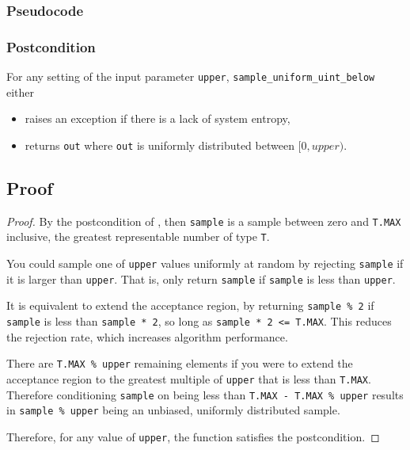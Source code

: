 \documentclass{article}
\begin{document}
\subsubsection*{Pseudocode}



\subsubsection*{Postcondition}
For any setting of the input parameter \texttt{upper},
\texttt{sample\_uniform\_uint\_below} either
\begin{itemize}
    \item raises an exception if there is a lack of system entropy,
    \item returns \texttt{out} where \texttt{out} is uniformly distributed between $[0, upper)$.
\end{itemize}

\subsection{Proof}
\begin{proof} 
\label{unsigned-integer-proof}
By the postcondition of ,
then \texttt{sample} is a sample between zero and \texttt{T.MAX} inclusive, the greatest representable number of type \texttt{T}.

You could sample one of \texttt{upper} values uniformly at random by rejecting \texttt{sample} if it is larger than \texttt{upper}.
That is, only return \texttt{sample} if \texttt{sample} is less than \texttt{upper}.

It is equivalent to extend the acceptance region, 
by returning \texttt{sample \% 2} if \texttt{sample} is less than \texttt{sample * 2}, 
so long as \texttt{sample * 2 <= T.MAX}.
This reduces the rejection rate, which increases algorithm performance.

There are \texttt{T.MAX \% upper} remaining elements if you were to 
extend the acceptance region to the greatest multiple of \texttt{upper} that is less than \texttt{T.MAX}.
Therefore conditioning \texttt{sample} on being less than \texttt{T.MAX - T.MAX \% upper} 
results in \texttt{sample \% upper} being an unbiased, uniformly distributed sample.

\noindent Therefore, for any value of \texttt{upper}, the function satisfies the postcondition.
\end{proof}
\end{document}
